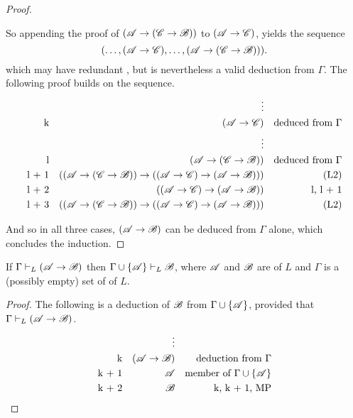 \begin{proposition}
\begin{proof}
\begin{enumerate}
      So appending the proof of \((\mathscr{A} \rightarrow (\mathscr{C} \rightarrow \mathscr{B}))\) to \((\mathscr{A} \rightarrow \mathscr{C})\), yields the sequence
        \[(\dots, (\mathscr{A} \rightarrow \mathscr{C}), \dots, (\mathscr{A} \rightarrow (\mathscr{C} \rightarrow \mathscr{B}))).\]
      which may have redundant \wfs{}, but is nevertheless a valid deduction from \(\Gamma\). The following proof builds on the sequence.
      \begin{align*}
        &&
        \vdots&&
        \\
        \text{k}&&
        (\mathscr{A} \rightarrow \mathscr{C})&&
        \text{deduced from \(\Gamma\)}\\
        &&
        \vdots&&
        \\
        \text{l}&&
        (\mathscr{A} \rightarrow (\mathscr{C} \rightarrow \mathscr{B}))&&
        \text{deduced from \(\Gamma\)}\\
        \text{l + 1}&&
        ((\mathscr{A} \rightarrow (\mathscr{C} \rightarrow \mathscr{B})) \rightarrow ((\mathscr{A} \rightarrow \mathscr{C}) \rightarrow (\mathscr{A} \rightarrow \mathscr{B})))&&
        \text{(L2)}\\
        \text{l + 2}&&
        ((\mathscr{A} \rightarrow \mathscr{C}) \rightarrow (\mathscr{A} \rightarrow \mathscr{B}))&&
        \text{l, l + 1}\\
        \text{l + 3}&&
        ((\mathscr{A} \rightarrow (\mathscr{C} \rightarrow \mathscr{B})) \rightarrow ((\mathscr{A} \rightarrow \mathscr{C}) \rightarrow (\mathscr{A} \rightarrow \mathscr{B})))&&
        \text{(L2)}
      \end{align*}
    \end{enumerate}

    And so in all three cases, \((\mathscr{A} \rightarrow \mathscr{B})\) can be deduced from \(\Gamma\) alone, which concludes the induction.
  \end{proof}
\end{proposition}

\begin{proposition}
  If \(\Gamma \vdash_{L} (\mathscr{A} \rightarrow \mathscr{B})\) then \(\Gamma \cup \{\mathscr{A}\} \vdash_{L} \mathscr{B}\), where \(\mathscr{A}\) and \(\mathscr{B}\) are \wfs{} of \(L\) and \(\Gamma\) is a (possibly empty) set of \wfs{} of \(L\).

  \begin{proof}
    The following is a deduction of \(\mathscr{B}\) from \(\Gamma \cup \{\mathscr{A}\}\), provided that \(\Gamma \vdash_{L} (\mathscr{A} \rightarrow \mathscr{B})\).
    \begin{align*}
      &&
      \vdots&&
      \\
      \text{k}&&
      (\mathscr{A} \rightarrow \mathscr{B})&&
      \text{deduction from \(\Gamma\)}\\
      \text{k + 1}&&
      \mathscr{A}&&
      \text{member of \(\Gamma \cup \{\ensuremath\mathscr{A}\}\)}\\
      \text{k + 2}&&
      \mathscr{B}&&
      \text{k, k + 1, MP}
    \end{align*}
  \end{proof}
\end{proposition}


